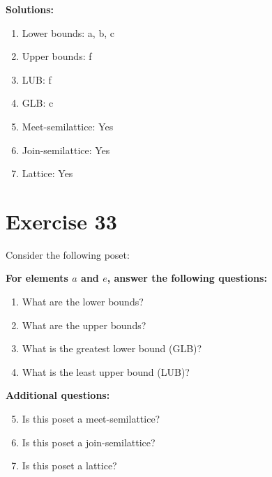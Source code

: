 \documentclass{article}
\begin{document}
\textbf{Solutions:}
\begin{enumerate}
    \item Lower bounds: {a, b, c}
    \item Upper bounds: {f}
    \item LUB: f
    \item GLB: c
    \item Meet-semilattice: Yes
    \item Join-semilattice: Yes
    \item Lattice: Yes
\end{enumerate}
\newpage
\section*{Exercise 33}
Consider the following poset:
\begin{center}
\end{center}

    \textbf{For elements $a$ and $e$, answer the following questions:}
\begin{enumerate}
    \item What are the lower bounds?
    \item What are the upper bounds?
    \item What is the greatest lower bound (GLB)?
    \item What is the least upper bound (LUB)?
\end{enumerate}
    \hspace*{3ex} \textbf{Additional questions:}
\begin{enumerate}
    \setcounter{enumi}{4}
    \item Is this poset a meet-semilattice?
    \item Is this poset a join-semilattice?
    \item Is this poset a lattice?
\end{enumerate}
\end{document}
